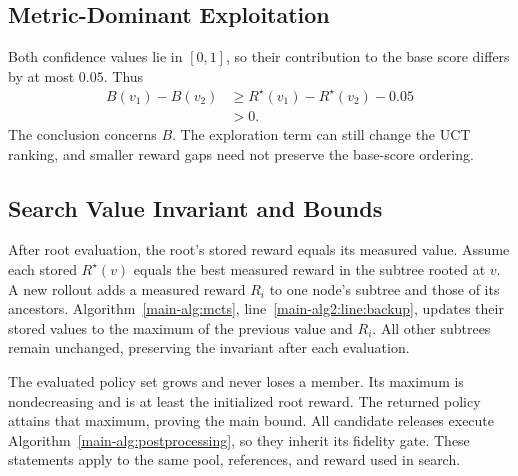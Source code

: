 \documentclass[conference]{IEEEtran}
\begin{document}
\subsection{Metric-Dominant Exploitation}
\begin{IEEEproof}
Both confidence values lie in $[0,1]$, so their contribution to the base score differs by at most $0.05$. Thus
\[
\begin{split}
B(v_1)-B(v_2)
&\ge R^\star(v_1)-R^\star(v_2)-0.05\\
&>0.
\end{split}
\]
The conclusion concerns $B$. The exploration term can still change the UCT ranking, and smaller reward gaps need not preserve the base-score ordering.
\end{IEEEproof}

\subsection{Search Value Invariant and Bounds}
\label{supp:search-bounds}
\begin{IEEEproof}
After root evaluation, the root's stored reward equals its measured value. Assume each stored $R^\star(v)$ equals the best measured reward in the subtree rooted at $v$. A new rollout adds a measured reward $R_i$ to one node's subtree and those of its ancestors. Algorithm~\ref{main-alg:mcts}, line~\ref{main-alg2:line:backup}, updates their stored values to the maximum of the previous value and $R_i$. All other subtrees remain unchanged, preserving the invariant after each evaluation.

The evaluated policy set grows and never loses a member. Its maximum is nondecreasing and is at least the initialized root reward. The returned policy attains that maximum, proving the main bound. All candidate releases execute Algorithm~\ref{main-alg:postprocessing}, so they inherit its fidelity gate. These statements apply to the same pool, references, and reward used in search.
\end{IEEEproof}
\end{document}

